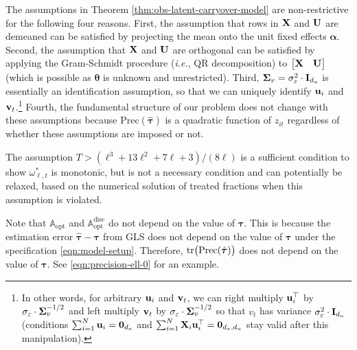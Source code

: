     \begin{remark}
    The assumptions in Theorem \ref{thm:obs-latent-carryover-model} are non-restrictive for the following four reasons. 
	First, the assumption that rows in $\mathbf{X}$ and $\mathbf{U}$ are demeaned can be satisfied by projecting the mean onto the unit fixed effects $\bm{\alpha}$. Second, the assumption that $\mathbf{X}$ and $\mathbf{U}$ are orthogonal can be satisfied by applying the Gram-Schmidt procedure ({\it i.e.}, QR decomposition) to $\begin{bmatrix}
	 \mathbf{X} & \mathbf{U} \end{bmatrix}$ (which is possible as $\bm{\theta}$ is unknown and unrestricted). Third, $\mathbf{\Sigma}_v = \sigma_\varepsilon^2 \cdot \mathbf{I}_{d_u}$ is essentially an identification assumption, so that we can uniquely identify $\mathbf{u}_i$ and $\mathbf{v}_t$.\footnote{In other words, for arbitrary $\mathbf{u}_i$ and $\mathbf{v}_t$, we can right multiply $\mathbf{u}_i^\top$ by $\sigma_\varepsilon \cdot \mathbf{\Sigma}_v^{-1/2}$ and left multiply  $\mathbf{v}_t$ by $\sigma_\varepsilon \cdot \mathbf{\Sigma}_v^{-1/2}$ so that $v_t$ has variance $\sigma_\varepsilon^2 \cdot \mathbf{I}_{d_u}$ (conditions $\sum_{i = 1}^N \mathbf{u}_i = \bm{0}_{d_x}$ and  $\sum_{i = 1}^N \mathbf{X}_i \mathbf{u}_i^\top = \mathbf{0}_{d_x,d_u}$  stay valid after this manipulation).} Fourth, the fundamental structure of our problem does not change with these assumptions because $\mathrm{Prec}(\hat{\bm{\tau}})$ is a quadratic function of $z_{it}$ regardless of whether these assumptions are imposed or not. 
    \end{remark}

    	\begin{remark}[Assumption on $T$]
    	The assumption $T > (\ell^3+13\ell^2+7\ell+3)/(8 \ell) $
		is a sufficient condition to show $\omega_{\ell,t}^\ast$ is monotonic, but is not a necessary condition and can potentially be relaxed, based on the numerical solution of treated fractions when this assumption is violated.
	\end{remark}
		
	    \begin{remark}\label{rem:magnitude-treatment-effect}
    Note that $\mathbb{A}_{\mathrm{opt}} $ and $\mathbb{A}^{\mathrm{disc}}_{\mathrm{opt}}$ do not depend on the value of $\bm{\tau}$. This is because the estimation error $\hat{\bm{\tau}} - \bm{\tau}$ from GLS does not depend on the value of $\bm{\tau}$ under the specification \eqref{eqn:model-setup}. Therefore, $\mathrm{tr} \big(\mathrm{Prec}(\hat{\bm{\tau}})  \big)$ does not depend on the value of $\bm{\tau}$. See \eqref{eqn:precision-ell-0} for an example.
 	\end{remark}
	 


